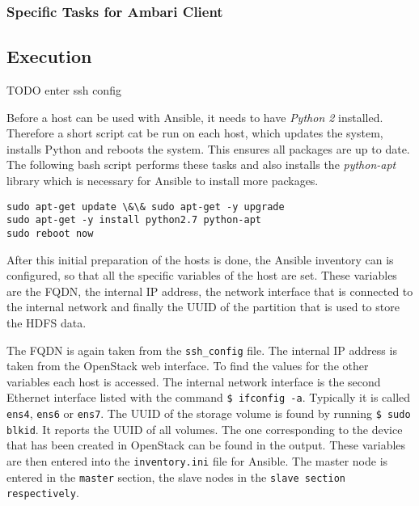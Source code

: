 \subsubsection{Specific Tasks for Ambari Client}
     


\subsection{Execution}

TODO enter ssh config

Before a host can be used with Ansible, it needs to have \emph{Python 2} installed.
Therefore a short script cat be run on each host, which updates the system, installs Python and reboots the system. This ensures all packages are up to date. The following bash script performs these tasks and also installs the \emph{python-apt} library which is necessary for Ansible to install more packages.

\lstset{language=sh}
\begin{lstlisting}[caption={Bash script for initial host preparation}, label={lst:hostsetup}]
sudo apt-get update \&\& sudo apt-get -y upgrade
sudo apt-get -y install python2.7 python-apt
sudo reboot now
\end{lstlisting}

After this initial preparation of the hosts is done, 
the Ansible inventory can is configured, 
so that all the specific variables of the host are set. 
These variables are the \ac{FQDN}, the internal \ac{IP} address, 
the network interface that is connected to the internal network 
and finally the \ac{UUID} of the partition that is used to store the \ac{HDFS} data.

The \ac{FQDN} is again taken from the \texttt{ssh\_config} file. 
The internal \ac{IP} address is taken from the OpenStack web interface.
To find the values for the other variables each host is accessed.
The internal network interface is the second Ethernet interface listed with the command \texttt{\$ ifconfig -a}. Typically it is called \texttt{ens4}, \texttt{ens6} or \texttt{ens7}.
The \ac{UUID} of the storage volume is found by running \texttt{\$ sudo blkid}. 
It reports the \ac{UUID} of all volumes. The one corresponding to the device that has been created in OpenStack can be found in the output. These variables are then entered into the \texttt{inventory.ini} file for Ansible. The master node is entered in the \texttt{master} section, the slave nodes in the \texttt{slave section respectively}.

